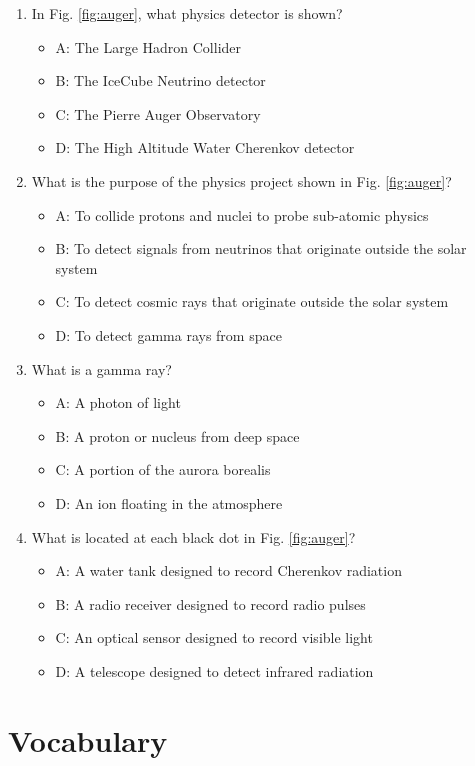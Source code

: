 \documentclass[10pt]{article}
\begin{document}
\begin{enumerate}
\item In Fig. \ref{fig:auger}, what physics detector is shown?
\begin{itemize}
\item A: The Large Hadron Collider
\item B: The IceCube Neutrino detector
\item C: The Pierre Auger Observatory
\item D: The High Altitude Water Cherenkov detector
\end{itemize}
\item What is the purpose of the physics project shown in Fig. \ref{fig:auger}?
\begin{itemize}
\item A: To collide protons and nuclei to probe sub-atomic physics
\item B: To detect signals from neutrinos that originate outside the solar system
\item C: To detect cosmic rays that originate outside the solar system
\item D: To detect gamma rays from space
\end{itemize}
\item What is a gamma ray?
\begin{itemize}
\item A: A photon of light
\item B: A proton or nucleus from deep space
\item C: A portion of the aurora borealis
\item D: An ion floating in the atmosphere
\end{itemize}
\item What is located at each black dot in Fig. \ref{fig:auger}? 
\begin{itemize}
\item A: A water tank designed to record Cherenkov radiation
\item B: A radio receiver designed to record radio pulses
\item C: An optical sensor designed to record visible light
\item D: A telescope designed to detect infrared radiation
\end{itemize}
\end{enumerate}

\section{Vocabulary}
\end{document}
